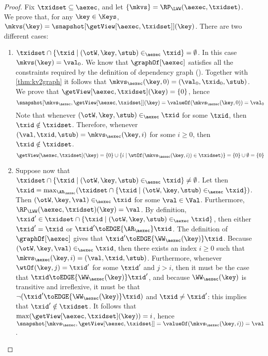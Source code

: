 \begin{proof}
Fix $\txidset \subseteq \aexec$, and let $\{\mkvs\} = \RP_{\LWW}(\aexec, \txidset)$. We prove that, for any $\key \in \Keys$, 
$\mkvs(\key) = \snapshot[\getView[\aexec, \txidset]](\key)$. There are two different cases: 
\begin{enumerate}
\item $\txidset \cap \{ \txid \mid (\otW, \key, \stub) \in_{\aexec} \txid \} = \emptyset$. 
In this case $\mkvs(\key) = \val_0$. 
We know that $\graphOf[\aexec]$ satisfies all the constraints required by the definition of dependency graph 
(\cite{laws}). Together with \cref{thm:kv2graph} it follows that $\mkvs_{\aexec}(\key, 0) = (\val_0, \txid_0, \stub)$.
We prove that $\getView[\aexec, \txidset](\key) = \{0\}$, 
hence 
\[ 
\snapshot[\mkvs_{\aexec}, \getView[\aexec, \txidset]](\key) = \valueOf(\mkvs_{\aexec}(\key, 0)) = \val_{0}
\]
Note that whenever $(\otW, \key, \stub) \in_{\aexec} \txid$ for some $\txid$, then 
$\txid \notin \txidset$. Therefore, whenever $(\val, \txid, \stub) = \mkvs_{\aexec}(\key, i)$ for some $i \geq 0$, then 
$\txid \notin \txidset$.
\[
\getView[\aexec, \txidset](\key) = \{0\} \cup \{i \mid \wtOf(\mkvs_{\aexec}(\key, i)) \in \txidset)\} = \{0\} \cup \emptyset = \{0\}
\]
\item Suppose now that $\txidset \cap \{ \txid \mid (\otW, \key, \stub) \in_{\aexec} \txid \} \neq \emptyset$. 
Let then $\txid = \max_{\AR_{\aexec}}(\txidset \cap \{\txid \mid (\otW, \key, \stub) \in_{\aexec} \txid\})$. 
Then $(\otW, \key, \val) \in_{\aexec} \txid$ for some $\val \in \Val$. Furthermore, $\RP_{\LWW}(\aexec, \txidset)(\key) = \val$.
By definition, $\txid' \in \txidset \cap \{ \txid \mid (\otW, \key, \stub) \in_{\aexec} \txid\}$, 
then either $\txid' = \txid$ or $\txid' \toEDGE{\AR_{\aexec}} \txid$. The definition of 
$\graphOf[\aexec]$ gives that $\txid' \toEDGE{\WW_{\aexec}(\key)} \txid$. 
Because $(\otW, \key, \val) \in_{\aexec} \txid$, then there exists an index 
$i \geq 0$ such that $\mkvs_{\aexec}(\key, i) = (\val, \txid, \stub)$. Furthermore, 
whenever $\wtOf(\key, j) = \txid'$ for some $\txid'$ and $j > i$, then it must 
be the case that $\txid \toEDGE{\WW_{\aexec}(\key)} \txid'$, and because 
$\WW_{\aexec}(\key)$ is transitive and irreflexive, it must be that  
$\neg( \txid' \toEDGE{\WW_{\aexec}(\key)} \txid)$ and $\txid \neq \txid'$: this implies that 
$\txid' \notin \txidset$. It follows that $\max(\getView[\aexec, \txidset](\key)) = i$, hence 
$\snapshot[\mkvs_{\aexec}, \getView[\aexec, \txidset]] = \valueOf(\mkvs_{\aexec}(\key, i)) = \val$.
\end{enumerate}
\end{proof}

